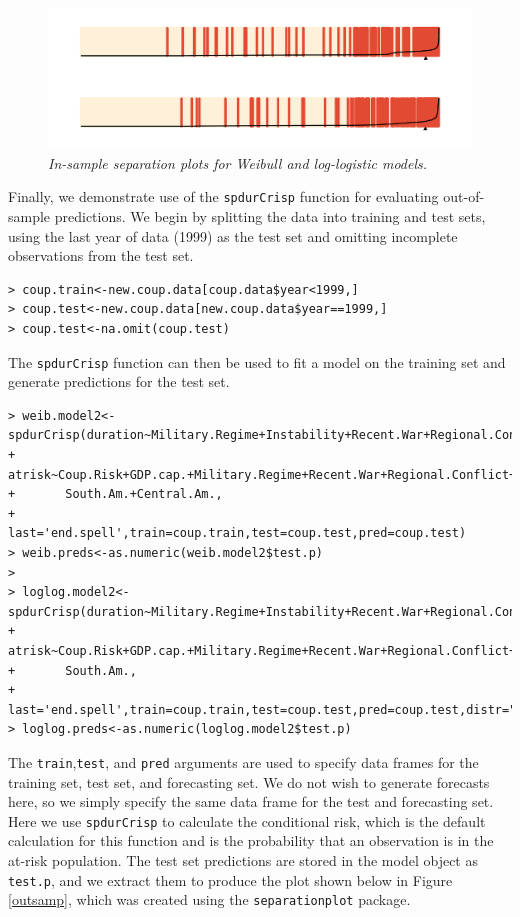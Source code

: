 \documentclass[article]{jss}
\begin{document}
\begin{figure}[htbp!]
\centering
\includegraphics[width=5in]{graphics/in-sample.pdf}
\caption{{\em In-sample separation plots for Weibull and log-logistic models.}} \label{insamp}
\end{figure}

Finally, we demonstrate use of the \texttt{spdurCrisp} function for
evaluating out-of-sample predictions. We begin by splitting the data
into training and test sets, using the last year of data (1999) as the
test set and omitting incomplete observations from the test set. \small

\begin{verbatim}
> coup.train<-new.coup.data[coup.data$year<1999,]
> coup.test<-new.coup.data[new.coup.data$year==1999,]
> coup.test<-na.omit(coup.test)
\end{verbatim}

\normalsize
The \texttt{spdurCrisp} function can then be used to fit a model on the
training set and generate predictions for the test set. \small

\begin{verbatim}
> weib.model2<-spdurCrisp(duration~Military.Regime+Instability+Recent.War+Regional.Conflict,
+       atrisk~Coup.Risk+GDP.cap.+Military.Regime+Recent.War+Regional.Conflict+
+       South.Am.+Central.Am.,
+       last='end.spell',train=coup.train,test=coup.test,pred=coup.test)
> weib.preds<-as.numeric(weib.model2$test.p)
>
> loglog.model2<-spdurCrisp(duration~Military.Regime+Instability+Recent.War+Regional.Conflict,
+       atrisk~Coup.Risk+GDP.cap.+Military.Regime+Recent.War+Regional.Conflict+
+       South.Am.,
+       last='end.spell',train=coup.train,test=coup.test,pred=coup.test,distr="loglog")
> loglog.preds<-as.numeric(loglog.model2$test.p)
\end{verbatim}

\normalsize
The \texttt{train},\texttt{test}, and \texttt{pred} arguments are used
to specify data frames for the training set, test set, and forecasting
set. We do not wish to generate forecasts here, so we simply specify the
same data frame for the test and forecasting set. Here we use
\texttt{spdurCrisp} to calculate the conditional risk, which is the
default calculation for this function and is the probability that an
observation is in the at-risk population. The test set predictions are
stored in the model object as \texttt{test.p}, and we extract them to
produce the plot shown below in Figure \ref{outsamp}, which was created
using the \texttt{separationplot} package. \small
\end{document}
